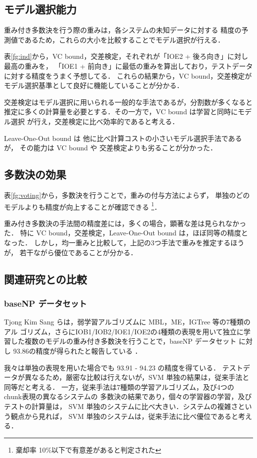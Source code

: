 \subsection{モデル選択能力}
重み付き多数決を行う際の重みは，各システムの未知データに対する
精度の予測値であるため，これらの大小を比較することでモデル選択が行える．

表\ref{fg:ind}から，VC bound，交差検定，それぞれが「IOE2 + 後ろ向き」に対し最高の重みを，
「IOE1 + 前向き」に最低の重みを算出しており，テストデータに対する精度をうまく予想してる．
これらの結果から，VC bound，交差検定がモデル選択基準として良好に機能していることが分かる．

交差検定はモデル選択に用いられる一般的な手法であるが，分割数が多くなると
推定に多くの計算量を必要とする．その一方で，VC bound は学習と同時にモデル選択
が行え，交差検定に比べ効率的であると考える．

Leave-One-Out bound は 他に比べ計算コストの小さいモデル選択手法であるが，
その能力は VC bound や 交差検定よりも劣ることが分かった．

\subsection{多数決の効果}
表\ref{fg:voting}から，多数決を行うことで，重みの付与方法によらず，
単独のどのモデルよりも精度が向上することが確認できる
\footnote{棄却率 10\%以下で有意差があると判定された}．

重み付き多数決の手法間の精度差には，多くの場合，顕著な差は見られなかった．
特に VC bound，交差検定，Leave-One-Out bound は，ほぼ同等の精度となった．
しかし，均一重みと比較して，上記の3つ手法で重みを推定するほうが，
若干ながら優位であることが分かる．

\subsection{関連研究との比較}
\subsubsection{baseNP データセット}
Tjong Kim Sang らは，弱学習アルゴリズムに MBL，ME，IGTree 等の7種類のアル
ゴリズム，さらにIOB1/IOB2/IOE1/IOE2の4種類の表現を用いて独立に学
習した複数のモデルの重み付き多数決を行うことで，baseNP データセット
に対し 93.86の精度が得られたと報告している
\cite{Tjong_Kim_Sang2000a,Tjong_Kim_Sang2000b}．

我々は単独の表現を用いた場合でも 93.91 - 94.23 の精度を得ている．
テストデータが異なるため，厳密な比較は行えないが，SVM 単独の結果は，従来手法と同等だと考える．
一方，従来手法は7種類の学習アルゴリズム，及び4つの chunk表現の異なるシステムの
多数決の結果であり，個々の学習器の学習，及びテストの計算量は，
SVM 単独のシステムに比べ大きい．システムの複雑さという観点から見れば，
SVM 単独のシステムは，従来手法に比べ優位であると考える．

